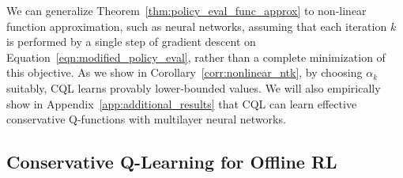 We can generalize Theorem~\ref{thm:policy_eval_func_approx} to non-linear function approximation, such as neural networks, assuming that each iteration $k$ is performed by a single step of gradient descent on Equation~\ref{eqn:modified_policy_eval}, rather than a complete minimization of this objective. As we show in Corollary~\ref{corr:nonlinear_ntk}, by choosing $\alpha_k$ suitably, CQL learns provably lower-bounded values. We will also empirically show in Appendix~\ref{app:additional_results} that CQL can learn effective conservative Q-functions with multilayer neural networks.


\vspace{-5pt}
\subsection{Conservative Q-Learning for Offline RL}
\label{sec:framework}

